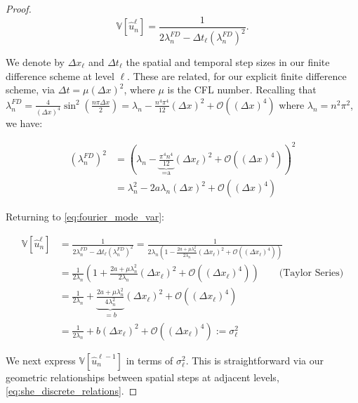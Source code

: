 \begin{proof}
    \begin{equation}\label{eq:fourier_mode_var}
        \mathbb{V}[\hat{u}_n^\ell] = \frac{1}{2 \lambda_n^{FD} - 
        \Delta t_\ell (\lambda_n^{FD})^2}.
    \end{equation}

    We denote by $\Delta x_\ell$ and $\Delta t_\ell$ the spatial
    and temporal step sizes in our finite difference scheme at level 
    $\ell$.
    These are related, for our explicit finite difference scheme,
    via $\Delta t = \mu (\Delta x)^2$, where $\mu$ is the CFL
    number. Recalling that $\lambda_n^{FD} = \frac{4}{(\Delta x)^4} 
    \sin^2\left(\frac{n \pi \Delta x}{2}\right) = \lambda_n - 
    \frac{n^4 \pi^4}{12}(\Delta x)^2 + \mathcal{O}((\Delta x)^4)$
    where $\lambda_n = n^2 \pi^2$, we have:

    \begin{align*}
        (\lambda_n^{FD})^2 &= (\lambda_n - 
        \underbrace{\frac{\pi^4 n^4}{12}}_{\text{=a}}(\Delta x_\ell)^2
         + \mathcal{O}((\Delta x)^4))^2\\
         &= \lambda_n^2 - 2 a \lambda_n (\Delta x)^2 + 
         \mathcal{O}((\Delta x)^4)
    \end{align*}

    Returning to \eqref{eq:fourier_mode_var}:

    \begin{align*}
        \mathbb{V}[\hat{u}_n^\ell] &= \frac{1}{2 \lambda_n^{FD} - 
        \Delta t_\ell (\lambda_n^{FD})^2} = 
        \frac{1}{2\lambda_n\left(1 - \frac{2a + \mu \lambda_n^2}{2\lambda_n}
        (\Delta x_\ell)^2 + \mathcal{O}\left((\Delta x_\ell)^4\right)\right)} \\
        &= \frac{1}{2 \lambda_n} \left(1 + 
        \frac{2a + \mu \lambda_n^2}{2 \lambda_n} (\Delta x_\ell)^2
        + \mathcal{O}\left((\Delta x_\ell)^4\right) \right)
        \qquad \text{(Taylor Series)} \\
        &= \frac{1}{2\lambda_n} + 
        \underbrace{\frac{2a + \mu \lambda_n^2}{4\lambda_n^2}}_{=b}(\Delta x_\ell)^2
        + \mathcal{O}\left((\Delta x_\ell)^4\right)
        \\
        &= \frac{1}{2\lambda_n} + 
        b(\Delta x_\ell)^2
        + \mathcal{O}\left((\Delta x_\ell)^4\right) := \sigma_\ell^2
    \end{align*}

    We next express $\mathbb{V}[\hat{u}_n^{\ell-1}]$ in terms of 
    $\sigma_\ell^2$. This is straightforward via our geometric relationships
    between spatial steps at adjacent levels, 
    \eqref{eq:she_discrete_relations}.


\end{proof}
